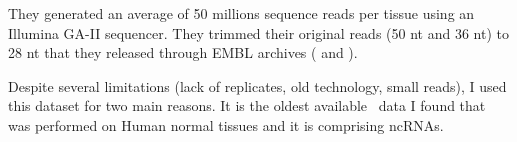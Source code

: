     They generated an average of 50 millions sequence reads per tissue
    using an Illumina GA-II sequencer. They trimmed their original reads
    (50 \gls{nt}
    and 36 \gls{nt}) to 28 \gls{nt} that they released through EMBL archives
    ( and ).

    Despite several limitations (lack of replicates, old technology, small reads),
    I used this dataset for two main reasons. It is the oldest available \Rnaseq\
    data I found that was performed on Human normal tissues and it is comprising
    \glspl{ncRNA}.

